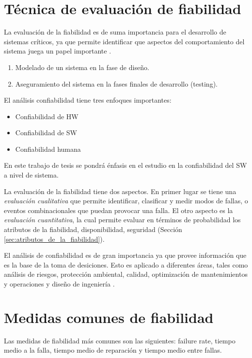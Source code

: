 \section{Técnica de evaluación de fiabilidad}\label{sec:tecnicas_evaluacion_fiabilidad}
La evaluación de la fiabilidad es de suma importancia para el desarrollo de sistemas críticos, ya
que permite identificar que aspectos del comportamiento del sistema juega un papel importante
\citep{FTDesign}.

\begin{enumerate}
 \item Modelado de un sistema en la fase de diseño.
 \item Aseguramiento del sistema en la fases finales de desarrollo (testing).
\end{enumerate}
El análisis confiabilidad tiene tres enfoques importantes:
\begin{itemize}
  \item Confiabilidad de \ac{HW}
  \item Confiabilidad de \ac{SW}
  \item Confiabilidad humana
\end{itemize}
En este trabajo de tesis se pondrá énfasis en el estudio en la confiabilidad del \ac{SW} a nivel de sistema.

La evaluación de la fiabilidad tiene dos aspectos. En primer lugar se tiene una \textit{evaluación
cualitativa} que permite identificar, clasificar y medir modos de fallas, o eventos combinacionales
que puedan provocar una falla. El otro aspecto es la \textit{evaluación cuantitativa}, la cual
permite evaluar en términos de probabilidad los atributos de la fiabilidad, disponibilidad, seguridad (Sección \ref{sec:atributos_de_la_fiabilidad}).

El análisis de confiabilidad es de gran importancia ya que provee información que es la base de la toma de desiciones.
Esto es aplicado a diferentes áreas, tales como análisis de riesgos, protección ambiental, calidad, optimización de mantenimientos y operaciones y diseño de ingeniería \citep{Rausand04}.

\section{Medidas comunes de fiabilidad}\label{sec:medidas_fiabilidad}
Las medidas de fiabilidad más comunes son las siguientes: failure rate, tiempo medio a la falla,
tiempo medio de reparación y tiempo medio entre fallas.

